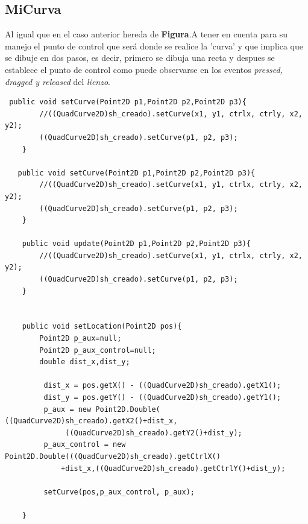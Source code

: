 \subsection{MiCurva}
Al igual que en el caso anterior hereda de \textbf{Figura}.A tener en cuenta para su manejo el punto de control\cite{Curva} que será donde se realice la 'curva' y que implica que se dibuje en dos pasos, es decir, primero se dibuja una recta y despues se establece el punto de control como puede observarse en los eventos \emph{pressed, dragged y released } del \emph{lienzo}.
\begin{lstlisting}
 public void setCurve(Point2D p1,Point2D p2,Point2D p3){
        //((QuadCurve2D)sh_creado).setCurve(x1, y1, ctrlx, ctrly, x2, y2);
        ((QuadCurve2D)sh_creado).setCurve(p1, p2, p3);
    }
    
   public void setCurve(Point2D p1,Point2D p2,Point2D p3){
        //((QuadCurve2D)sh_creado).setCurve(x1, y1, ctrlx, ctrly, x2, y2);
        ((QuadCurve2D)sh_creado).setCurve(p1, p2, p3);
    }
 
    public void update(Point2D p1,Point2D p2,Point2D p3){
        //((QuadCurve2D)sh_creado).setCurve(x1, y1, ctrlx, ctrly, x2, y2);
        ((QuadCurve2D)sh_creado).setCurve(p1, p2, p3);
    }
    
 
    public void setLocation(Point2D pos){
        Point2D p_aux=null;
        Point2D p_aux_control=null;
        double dist_x,dist_y;
        
         dist_x = pos.getX() - ((QuadCurve2D)sh_creado).getX1();
         dist_y = pos.getY() - ((QuadCurve2D)sh_creado).getY1();
         p_aux = new Point2D.Double( ((QuadCurve2D)sh_creado).getX2()+dist_x, 
              ((QuadCurve2D)sh_creado).getY2()+dist_y);
         p_aux_control = new Point2D.Double(((QuadCurve2D)sh_creado).getCtrlX()
             +dist_x,((QuadCurve2D)sh_creado).getCtrlY()+dist_y);
      
         setCurve(pos,p_aux_control, p_aux);
                   
    }  
\end{lstlisting}
